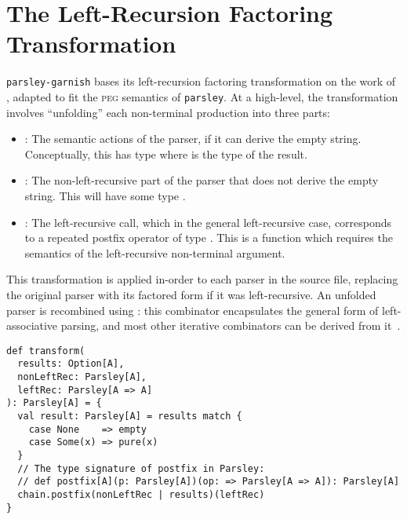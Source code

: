 \documentclass[../../main.tex]{subfiles}
\begin{document}
\section{The Left-Recursion Factoring Transformation}
\texttt{parsley-garnish} bases its left-recursion factoring transformation on the work of \textcite{baars_leftrec_2004}, adapted to fit the \textsc{peg} semantics of \texttt{parsley}.
At a high-level, the transformation involves ``unfolding'' each non-terminal production into three parts:
\begin{itemize}
  \item {}: The semantic actions of the parser, if it can derive the empty string. Conceptually, this has type  where  is the type of the result.
  \item {}: The non-left-recursive part of the parser that does not derive the empty string. This will have some type .
  \item {}: The left-recursive call, which in the general left-recursive case, corresponds to a repeated postfix operator of type . This is a function which requires the semantics of the left-recursive non-terminal argument.
\end{itemize}
%
This transformation is applied in-order to each parser in the source file, replacing the original parser with its factored form if it was left-recursive.
An unfolded parser is recombined using : this combinator encapsulates the general form of left-associative parsing, and most other iterative combinators can be derived from it~\cite{willis_parsley_2024}.
\begin{verbatim}
def transform(
  results: Option[A],
  nonLeftRec: Parsley[A],
  leftRec: Parsley[A => A]
): Parsley[A] = {
  val result: Parsley[A] = results match {
    case None    => empty
    case Some(x) => pure(x)
  }
  // The type signature of postfix in Parsley:
  // def postfix[A](p: Parsley[A])(op: => Parsley[A => A]): Parsley[A]
  chain.postfix(nonLeftRec | results)(leftRec)
}
\end{verbatim}
\end{document}
